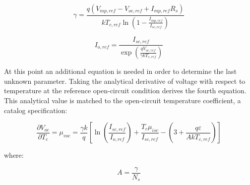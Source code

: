 \begin{equation}
\gamma  = \frac{{q\left( {{V_{mp,ref}} - {V_{oc,ref}} + I_{mp,ref}^{}{R_s}} \right)}}{{k{T_{c,ref}}\ln \left( {1 - \frac{{{I_{mp,ref}}}}{{{I_{sc,ref}}}}} \right)}}
\label{eq:ElecLoadGamma876}
\end{equation}

\begin{equation}
{I_{o,ref}} = \frac{{{I_{sc,ref}}}}{{\exp \left( {\frac{{q{V_{oc,ref}}}}{{\gamma k{T_{c,ref}}}}} \right)}}
\label{eq:ElecLoadIoref877}
\end{equation}

At this point an additional equation is needed in order to determine the last unknown parameter. Taking the analytical derivative of voltage with respect to temperature at the reference open-circuit condition derives the fourth equation. This analytical value is matched to the open-circuit temperature coefficient, a catalog specification:

\begin{equation}
\frac{{\partial {V_{oc}}}}{{\partial {T_c}}} = {\mu_{voc}} = \frac{{\gamma k}}{q}\left[ {\ln \left( {\frac{{{I_{sc,ref}}}}{{{I_{o,ref}}}}} \right) + \frac{{{T_c}\mu_{isc}^{}}}{{{I_{sc,ref}}}} - \left( {3 + \frac{{q\varepsilon }}{{Ak{T_{c,ref}}}}} \right)} \right]
\label{eq:ElecLoaddVocdTc878}
\end{equation}

where:

\begin{equation}
A = \frac{\gamma }{{{N_s}}}
\end{equation}

